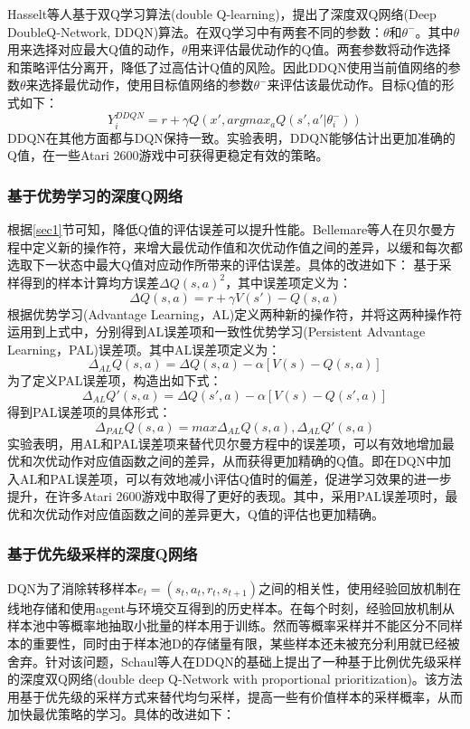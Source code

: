 \documentclass[bachelor]{thesis-uestc}
\begin{document}
	Hasselt等人基于双Q学习算法(double Q-learning)，提出了深度双Q网络(Deep DoubleQ-Network, DDQN)算法。在双Q学习中有两套不同的参数：$\theta$和$\theta^-$。其中$\theta$用来选择对应最大Q值的动作，$\theta$用来评估最优动作的Q值。两套参数将动作选择和策略评估分离开，降低了过高估计Q值的风险。因此DDQN使用当前值网络的参数$\theta$来选择最优动作，使用目标值网络的参数$\theta^-$来评估该最优动作。目标Q值的形式如下：
	\begin{equation}
		\label{eq8}
		Y_i^{DDQN}=r+\gamma Q(x',argmax_a Q(s',a'|\theta_i^-))
	\end{equation}
	DDQN在其他方面都与DQN保持一致。实验表明，DDQN能够估计出更加准确的Q值，在一些Atari 2600游戏中可获得更稳定有效的策略。
	
	\subsubsection{基于优势学习的深度Q网络}
	根据\ref{sec1}节可知，降低Q值的评估误差可以提升性能。Bellemare等人在贝尔曼方程中定义新的操作符，来增大最优动作值和次优动作值之间的差异，以缓和每次都选取下一状态中最大Q值对应动作所带来的评估误差。具体的改进如下：
	基于采样得到的样本计算均方误差$\Delta Q(s,a)^2$，其中误差项定义为：
	\begin{equation}
		\label{eq9}
		\Delta Q(s,a)=r+\gamma V(s')-Q(s,a)
	\end{equation}
	根据优势学习(Advantage Learning，AL)定义两种新的操作符，并将这两种操作符运用到上式中，分别得到AL误差项和一致性优势学习(Persistent Advantage Learning，PAL)误差项。其中AL误差项定义为：
	\begin{equation}
		\label{eq10}
		\Delta_{AL}Q(s,a)=\Delta Q(s,a)-\alpha[V(s)-Q(s,a)]
	\end{equation}
	为了定义PAL误差项，构造出如下式：
	\begin{equation}
		\label{eq11}
		\Delta_{AL}Q'(s,a)=\Delta Q(s',a)-\alpha[V(s)-Q(s',a)]
	\end{equation}
	得到PAL误差项的具体形式：
	\begin{equation}
		\label{eq12}
		\Delta_{PAL}Q(s,a)=max{\Delta_{AL}Q(s,a),\Delta_{AL}Q'(s,a)}
	\end{equation}
	实验表明，用AL和PAL误差项来替代贝尔曼方程中的误差项，可以有效地增加最优和次优动作对应值函数之间的差异，从而获得更加精确的Q值。即在DQN中加入AL和PAL误差项，可以有效地减小评估Q值时的偏差，促进学习效果的进一步提升，在许多Atari 2600游戏中取得了更好的表现。其中，采用PAL误差项时，最优和次优动作对应值函数之间的差异更大，Q值的评估也更加精确。
	
	\subsubsection{基于优先级采样的深度Q网络}
	DQN为了消除转移样本$e_t=(s_t,a_t,r_t,s_{t+1})$之间的相关性，使用经验回放机制在线地存储和使用agent与环境交互得到的历史样本。在每个时刻，经验回放机制从样本池中等概率地抽取小批量的样本用于训练。然而等概率采样并不能区分不同样本的重要性，同时由于样本池D的存储量有限，某些样本还未被充分利用就已经被舍弃。针对该问题，Schaul等人在DDQN的基础上提出了一种基于比例优先级采样的深度双Q网络(double deep Q-Network with proportional prioritization)。该方法用基于优先级的采样方式来替代均匀采样，提高一些有价值样本的采样概率，从而加快最优策略的学习。具体的改进如下：
\end{document}
